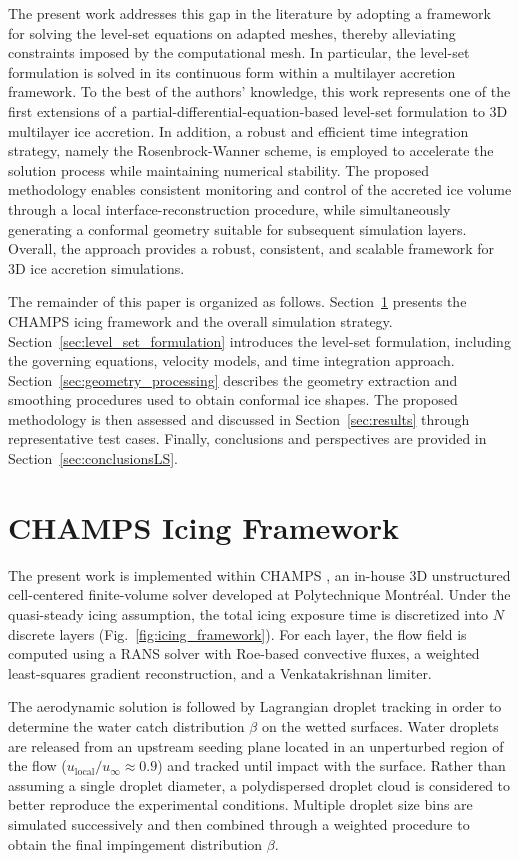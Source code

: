 The present work addresses this gap in the literature by adopting a framework for solving the level-set equations on adapted meshes, thereby alleviating constraints imposed by the computational mesh. In particular, the level-set formulation is solved in its continuous form within a multilayer accretion framework. To the best of the authors' knowledge, this work represents one of the first extensions of a partial-differential-equation-based level-set formulation to 3D multilayer ice accretion. In addition, a robust and efficient time integration strategy, namely the Rosenbrock-Wanner scheme, is employed to accelerate the solution process while maintaining numerical stability. The proposed methodology enables consistent monitoring and control of the accreted ice volume through a local interface-reconstruction procedure, while simultaneously generating a conformal geometry suitable for subsequent simulation layers. Overall, the approach provides a robust, consistent, and scalable framework for 3D ice accretion simulations.

The remainder of this paper is organized as follows. Section~\ref{sec:framework} presents the CHAMPS icing framework and the overall simulation strategy. Section~\ref{sec:level_set_formulation} introduces the level-set formulation, including the governing equations, velocity models, and time integration approach. Section~\ref{sec:geometry_processing} describes the geometry extraction and smoothing procedures used to obtain conformal ice shapes. The proposed methodology is then assessed and discussed in Section~\ref{sec:results} through representative test cases. Finally, conclusions and perspectives are provided in Section~\ref{sec:conclusionsLS}.

\section{CHAMPS Icing Framework}
\label{sec:framework}

The present work is implemented within \textsc{CHAMPS} \cite{champsArticle}, an in-house 3D unstructured cell-centered finite-volume solver developed at Polytechnique Montr\'eal. Under the quasi-steady icing assumption, the total icing exposure time is discretized into \(N\) discrete layers (Fig.~\ref{fig:icing_framework}). For each layer, the flow field is computed using a RANS solver with Roe-based convective fluxes, a weighted least-squares gradient reconstruction, and a Venkatakrishnan limiter.

The aerodynamic solution is followed by Lagrangian droplet tracking \cite{ZAYNI2026112019} in order to determine the water catch distribution $\beta$ on the wetted surfaces. Water droplets are released from an upstream seeding plane located in an unperturbed region of the flow ($u_{\mathrm{local}}/u_{\infty} \approx 0.9$) and tracked until impact with the surface. Rather than assuming a single droplet diameter, a polydispersed droplet cloud is considered to better reproduce the experimental conditions. Multiple droplet size bins are simulated successively and then combined through a weighted procedure to obtain the final impingement distribution $\beta$.

